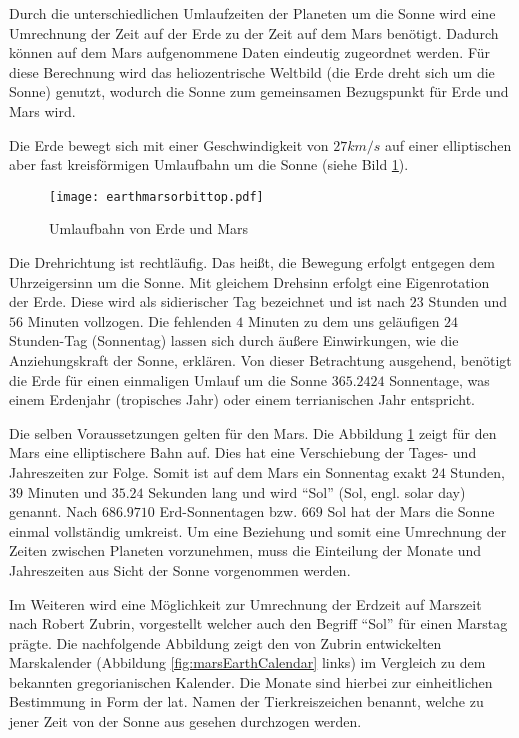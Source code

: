 \label{sec:zeitmessung}

Durch die unterschiedlichen Umlaufzeiten der Planeten um die Sonne wird eine
Umrechnung der Zeit auf der Erde zu der Zeit auf dem Mars ben{\"o}tigt.
Dadurch k{\"o}nnen auf dem Mars aufgenommene Daten eindeutig zugeordnet
werden.
F{\"u}r diese Berechnung wird das heliozentrische Weltbild (die Erde dreht sich
um die Sonne) genutzt, wodurch die Sonne zum gemeinsamen Bezugspunkt f{\"u}r
Erde und Mars wird.

Die Erde bewegt sich mit einer Geschwindigkeit von $27 km/s$ auf einer
elliptischen aber fast kreisf{\"o}rmigen Umlaufbahn um die Sonne (siehe Bild
\ref{fig:marsEarthOrbit}).

\begin{figure}[H]
	\centering
	\texttt{[image: earthmarsorbittop.pdf]}
	\caption[Umlaufbahn von Erde und Mars]{Umlaufbahn von Erde und Mars \cite{img1}}
	\label{fig:marsEarthOrbit}
\end{figure}

Die Drehrichtung ist rechtl{\"a}ufig. Das hei{\ss}t, die Bewegung erfolgt
entgegen dem Uhrzeigersinn um die Sonne. Mit gleichem Drehsinn erfolgt eine Eigenrotation
der Erde. Diese wird als sidierischer Tag bezeichnet und ist nach $23$ Stunden
und $56$ Minuten vollzogen. Die fehlenden $4$ Minuten zu dem uns gel{\"a}ufigen
$24$ Stunden-Tag (Sonnentag) lassen sich durch {\"a}u{\ss}ere Einwirkungen,
wie die Anziehungskraft der Sonne, erkl{\"a}ren. Von dieser Betrachtung
ausgehend, ben{\"o}tigt die Erde f{\"u}r einen einmaligen Umlauf um die Sonne
$365.2424$ Sonnentage, was einem Erdenjahr (tropisches Jahr) oder einem
terrianischen Jahr entspricht.

Die selben Voraussetzungen gelten f{\"u}r den Mars. Die Abbildung
\ref{fig:marsEarthOrbit} zeigt f{\"u}r den Mars eine elliptischere Bahn
auf. Dies hat eine Verschiebung der Tages- und Jahreszeiten zur Folge. Somit ist
auf dem Mars ein Sonnentag exakt $24$ Stunden, $39$ Minuten und $35.24$ Sekunden lang und
wird "`Sol"' (Sol, engl. solar day) genannt. Nach $686.9710$ Erd-Sonnentagen
bzw. $669$ Sol hat der Mars die Sonne einmal vollst{\"a}ndig umkreist. Um eine Beziehung
und somit eine Umrechnung der Zeiten zwischen Planeten vorzunehmen, muss die
Einteilung der Monate und Jahreszeiten aus Sicht der Sonne vorgenommen werden.

Im Weiteren wird eine M{\"o}glichkeit zur Umrechnung der Erdzeit auf Marszeit
nach Robert Zubrin, vorgestellt welcher auch den Begriff "`Sol"'
f{\"u}r einen Marstag pr{\"a}gte. Die nachfolgende Abbildung zeigt den von Zubrin entwickelten
Marskalender (Abbildung \ref{fig:marsEarthCalendar} links) im Vergleich zu dem
bekannten gregorianischen Kalender. Die Monate sind hierbei zur einheitlichen
Bestimmung in Form der lat. Namen der Tierkreiszeichen benannt, welche zu jener
Zeit von der Sonne aus gesehen durchzogen werden.


